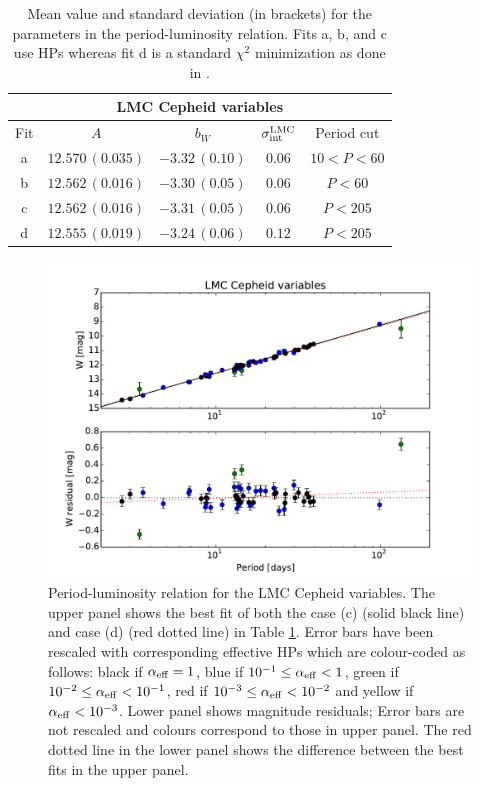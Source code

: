\begin{table}[tbp]
\centering
\begin{tabular}{@{}ccccc}
\hline
\multicolumn{5}{c}{LMC Cepheid variables} \\
\hline
Fit & $A$ & $b_W$ & $\sigma_{\mathrm{int}}^{\mathrm{LMC}}$ & Period cut \\
\hline
 a & $12.570\,(0.035)$ & $-3.32\,(0.10)$ & $0.06$ & $10<P<60$ \\
  
 b & $12.562\,(0.016)$&$-3.30\,(0.05)$ & $0.06$ & $P<60$ \\

 c & $12.562\,(0.016)$& $-3.31\,(0.05)$& $0.06$ & $P<205$ \\

 d & $12.555\,(0.019)$& $-3.24\,(0.06)$& $0.12$ & $P<205$ \\
\hline
\end{tabular}
\caption{\label{Table:LMC-fits} Mean value and standard deviation (in brackets) for the parameters in the period-luminosity relation. Fits a, b, and c use HPs whereas fit d is a standard $\chi^2$ minimization as done in \cite{Efstathiou:2013via}.}
\end{table}


\begin{figure}[tbp]
\centering %
\includegraphics[scale=0.75]{figures/chapter-h0/effective_HP_cepheids_LMC.pdf} 
\caption{Period-luminosity relation for the LMC Cepheid variables. The upper panel shows the best fit of both the case (c) (solid black line) and case (d) (red dotted line) in Table \ref{Table:LMC-fits}. Error bars have been rescaled with corresponding effective HPs which are colour-coded as follows: black if $\alpha_{\mathrm{eff}} = 1$, blue if $10^{-1}\leq \alpha_{\mathrm{eff}} < 1$, green if $10^{-2}\leq \alpha_{\mathrm{eff}} < 10^{-1}$, red if  $10^{-3} \leq \alpha_{\mathrm{eff}} < 10^{-2}$ and yellow if $\alpha_{\mathrm{eff}} < 10^{-3}$. Lower panel shows magnitude residuals; Error bars are not rescaled and colours correspond to those in upper panel. The red dotted line in the lower panel shows the difference between the best fits in the upper panel.}
\label{Fig:LMC-Cepheid-variables-fit-c}
\end{figure}

